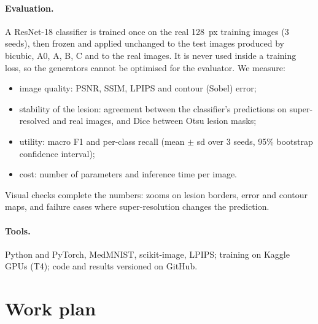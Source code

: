 \documentclass[11pt,a4paper]{article}
\begin{document}
\paragraph{Evaluation.} A ResNet-18 classifier is trained once on the real 128~px training images
(3 seeds), then frozen and applied unchanged to the test images produced by bicubic, A0, A, B, C and
to the real images. It is never used inside a training loss, so the generators cannot be optimised
for the evaluator. We measure:
\begin{itemize}
\item image quality: PSNR, SSIM, LPIPS and contour (Sobel) error;
\item stability of the lesion: agreement between the classifier's predictions on super-resolved
and real images, and Dice between Otsu lesion masks;
\item utility: macro F1 and per-class recall (mean $\pm$ sd over 3 seeds, 95\% bootstrap
confidence interval);
\item cost: number of parameters and inference time per image.
\end{itemize}
Visual checks complete the numbers: zooms on lesion borders, error and contour maps, and failure
cases where super-resolution changes the prediction.

\paragraph{Tools.} Python and PyTorch, MedMNIST, scikit-image, LPIPS; training on Kaggle GPUs
(T4); code and results versioned on GitHub.

\section{Work plan}
\end{document}
